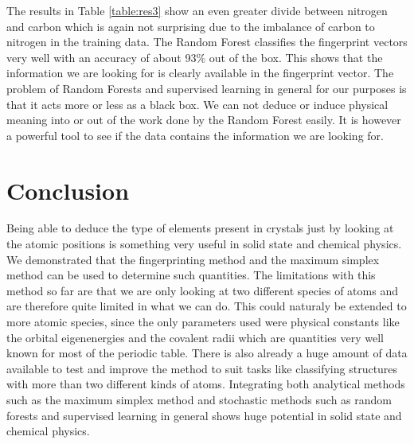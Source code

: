 The results in Table \ref{table:res3} show an even greater divide between nitrogen and carbon which is again not surprising due to the imbalance of carbon to nitrogen in the training data. The Random Forest classifies the fingerprint vectors very well with an accuracy of about 93\% out of the box. This shows that the information we are looking for is clearly available in the fingerprint vector. The problem of Random Forests and supervised learning in general for our purposes is that it acts more or less as a black box. We can not deduce or induce physical meaning into or out of the work done by the Random Forest easily. It is however a powerful tool to see if the data contains the information we are looking for.

\section{Conclusion}
Being able to deduce the type of elements present in crystals just by looking at the atomic positions is something very useful in solid state and chemical physics. We demonstrated that the fingerprinting method and the maximum simplex method can be used to determine such quantities. The limitations with this method so far are that we are only looking at two different species of atoms and are therefore quite limited in what we can do. This could naturaly be extended to more atomic species, since the only parameters used were physical constants like the orbital eigenenergies and the covalent radii which are quantities very well known for most of the periodic table. There is also already a huge amount of data available to test and improve the method to suit tasks like classifying structures with more than two different kinds of atoms. Integrating both analytical methods such as the maximum simplex method and stochastic methods such as random forests and supervised learning in general shows huge potential in solid state and chemical physics.

